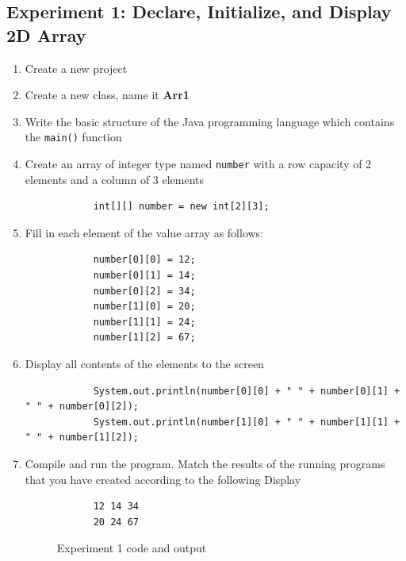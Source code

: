 \documentclass[12pt,titlepage]{article}
\begin{document}
\subsection{Experiment 1: Declare, Initialize, and Display 2D Array}
\begin{enumerate}
    \item Create a new project
    \item Create a new class, name it \textbf{Arr1}
    \item Write the basic structure of the Java programming language which contains the \texttt{main()} function
    \item {
        Create an array of integer type named \texttt{number} with a row capacity of 2 elements and a column of 3 elements

        \begin{verbatim}
            int[][] number = new int[2][3];
        \end{verbatim}
    }
    \item {
        Fill in each element of the value array as follows:

        \begin{verbatim}
            number[0][0] = 12;
            number[0][1] = 14;
            number[0][2] = 34;
            number[1][0] = 20;
            number[1][1] = 24;
            number[1][2] = 67;
        \end{verbatim}
    }
    \item {
        Display all contents of the elements to the screen

        \begin{verbatim}
            System.out.println(number[0][0] + " " + number[0][1] + " " + number[0][2]);
            System.out.println(number[1][0] + " " + number[1][1] + " " + number[1][2]);
        \end{verbatim}
    }
    \pagebreak
    \item {
        Compile and run the program. Match the results of the running programs that you have created according to the following Display

        \begin{verbatim}
            12 14 34
            20 24 67
        \end{verbatim}

        \begin{figure}[h]
            \centering
            \caption{Experiment 1 code and output}
        \end{figure}
    }
\end{enumerate}
\end{document}

